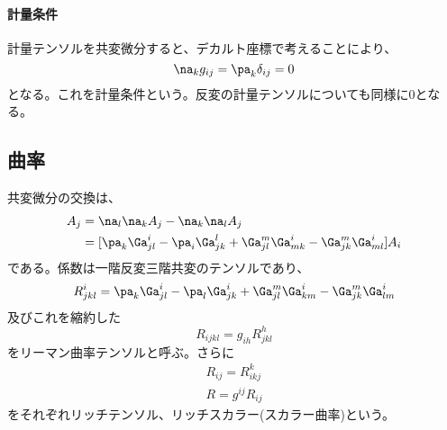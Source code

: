     \paragraph{計量条件}
        計量テンソルを共変微分すると、デカルト座標で考えることにより、
            \[\na_kg_{ij} = \pa_k\delta_{ij} = 0\]
        となる。これを計量条件という。反変の計量テンソルについても同様に0となる。

\subsection{曲率}
    共変微分の交換は、
    \begin{align*}
        [\na_l,\na_k]A_j &= \na_l\na_kA_j-\na_k\na_lA_j\\
        &= [\pa_k\Ga^i_{jl}-\pa_i\Ga^l_{jk}
        +\Ga^m_{jl}\Ga^i_{mk}-\Ga^m_{jk}\Ga^i_{ml}]A_i
    \end{align*}
    である。係数は一階反変三階共変のテンソルであり、
        \[R^i_{jkl}
        =\pa_k\Ga^i_{jl}-\pa_l\Ga^i_{jk}
        +\Ga^m_{jl}\Ga^i_{km}-\Ga^m_{jk}\Ga^i_{lm}\]
    及びこれを縮約した
        \[R_{ijkl} = g_{ih}R^h_{jkl}\]
    をリーマン曲率テンソルと呼ぶ。さらに
    \begin{gather*}
        R_{ij} = R^k_{ikj}\\
        R = g^{ij}R_{ij}
    \end{gather*}
    をそれぞれリッチテンソル、リッチスカラー(スカラー曲率)という。

